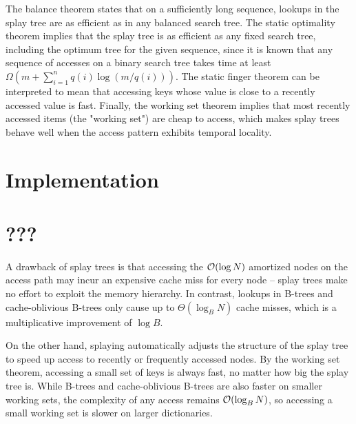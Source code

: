 The balance theorem states that on a sufficiently long sequence, lookups in
the splay tree are as efficient as in any balanced search tree. The static
optimality theorem implies that the splay tree is as efficient as any fixed
search tree, including the optimum tree for the given sequence, since
it is known that any sequence of accesses on a binary search tree
takes time at least $\Omega(m+\sum_{i=1}^n q(i)\log(m/q(i)))$.
The static finger theorem can be interpreted to mean that accessing keys
whose value is close to a recently accessed value is fast.
Finally, the working set theorem implies that most recently
accessed items (the "working set") are cheap to access, which
makes splay trees behave well when the access pattern exhibits temporal
locality.

\section{Implementation}


\section{???}
A drawback of splay trees is that accessing the $\mathcal{O}(\log N)$ amortized
nodes on the access path may incur an expensive cache miss for every node --
splay trees make no effort to exploit the memory hierarchy.
In contrast, lookups in B-trees and cache-oblivious B-trees
only cause up to $\Theta(\log_B N)$ cache misses, which is a multiplicative
improvement of $\log B$.

On the other hand, splaying automatically adjusts the structure of the splay
tree to speed up access to recently or frequently accessed nodes. By the
working set theorem, accessing a small set of keys is always fast, no matter
how big the splay tree is. While B-trees and cache-oblivious B-trees are
also faster on smaller working sets, the complexity of any access remains
$\mathcal{O}(\log_B N)$, so accessing a small working set is slower on larger
dictionaries.
